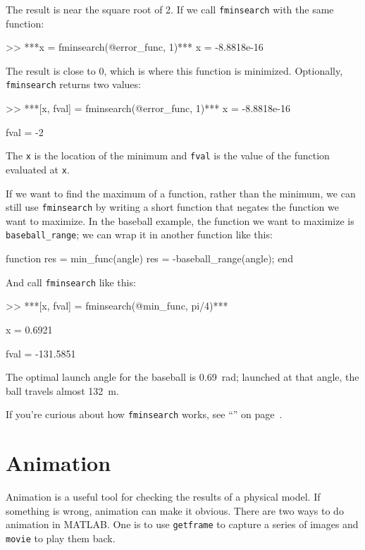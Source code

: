 The result is near the square root of 2.  If we call \lstinline{fminsearch} with the same function:

\begin{code}
>> ***x = fminsearch(@error_func, 1)***
x = -8.8818e-16
\end{code}

The result is close to 0, which is where this function is minimized.  Optionally, \lstinline{fminsearch} returns two values:

\begin{code}
>> ***[x, fval] = fminsearch(@error_func, 1)***
x = -8.8818e-16

fval = -2
\end{code}

The \lstinline{x} is the location of the minimum and \lstinline{fval} is the value of the function evaluated at \lstinline{x}.

If we want to find the maximum of a function, rather than the minimum, we can still use \lstinline{fminsearch} by writing a short function that negates the function we want to maximize.
In the baseball example, the function we want to maximize is \lstinline{baseball_range}; we can wrap it in another function like this:

\begin{code}
function res = min_func(angle)
    res = -baseball_range(angle);
end
\end{code}

And call \lstinline{fminsearch} like this:

\begin{code}
>> ***[x, fval] = fminsearch(@min_func, pi/4)***

x = 0.6921

fval = -131.5851
\end{code}

The optimal launch angle for the baseball is \SI{0.69}{\radian}; launched at that angle, the ball travels almost \SI{132}{\meter}.

If you're curious about how \lstinline{fminsearch} works, see ``'' on page~\pageref{howfminsearch}.


\section{Animation}

Animation is a useful tool for checking the results of a physical model.  
If something is wrong, animation can make it obvious.
There are two ways to do animation in MATLAB.  
One is to use \lstinline{getframe} to capture a series of images and \lstinline{movie} to play them back.

